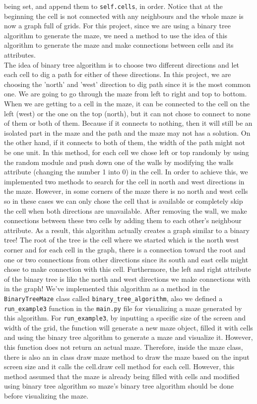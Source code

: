 \documentclass[fontsize=11pt]{article}
\begin{document}
being set, and append them to \texttt{self.cells}, in order. Notice that at the beginning the cell is not connected with any neighbours and the whole maze is now a graph full of grids. For this project, since we are using a binary tree algorithm to generate the maze, we need a method to use the idea of this algorithm to generate the maze and make connections between cells and its attributes.\\

The idea of binary tree algorithm is to choose two different directions and let each cell to dig a path for either of these directions. In this project, we are choosing the 'north' and 'west' direction to dig path since it is the most common one.  We are going to go through the maze from left to right and top to bottom. When we are getting to a cell in the maze, it can be connected to the cell on the left (west) or the one on the top (north), but it can not chose to connect to none of them or both of them. Because if it connects to nothing, then it will still be an isolated part in the maze and the path and the maze may not has a solution. On the other hand, if it connects to both of them, the width of the path might not be one unit. In this method, for each cell we chose left or top randomly by using the random module and push down one of the walls by modifying the walls attribute (changing the number 1 into 0) in the cell. In order to achieve this, we implemented two methods to search for the cell in north and west directions in the maze. However, in some corners of the maze there is no north and west cells so in these cases we can only chose the cell that is available or completely skip the cell when both directions are unavailable. After removing the wall, we make connections between these two cells by adding them to each other's neighbour attribute. As a result, this algorithm actually creates a graph similar to a binary tree! The root of the tree is the cell where we started which is the north west corner and for each cell in the graph, there is a connection toward the root and one or two connections from other directions since its south and east cells might chose to make connection with this cell. Furthermore, the left and right attribute of the binary tree is like the north and west directions we make connections with in the graph! We've implemented this algorithm as a method in the \texttt{BinaryTreeMaze} class called \texttt{binary\_tree\_algorithm}, also we defined a \texttt{run\_example3} function in the \texttt{main.py} file for visualizing a maze generated by this algorithm. For \texttt{run\_example3},  by inputting a specific size of the screen and width of the grid, the function will generate a new maze object, filled it with cells and using the binary tree algorithm to generate a maze and visualize it. However, this function does not return an actual maze. Therefore, inside the maze class, there is also an in class draw maze method to draw the maze based on the input screen size and it calls the cell.draw cell method for each cell. However, this method assumed that the maze is already being filled with cells and modified using binary tree algorithm so maze's binary tree algorithm should be done before visualizing the maze. \\
\end{document}
